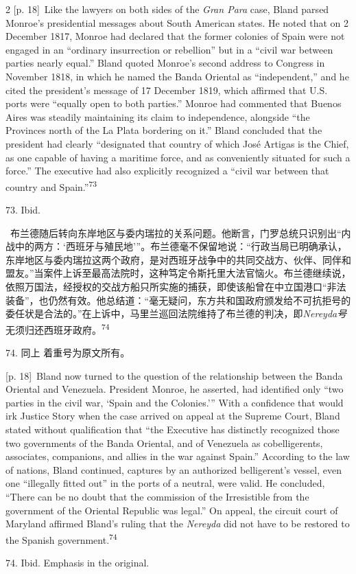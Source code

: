 \documentclass[10pt,a4paper]{article}
\begin{document}
\begin{paracol}{2}
{\scriptsize\color{gray} [p. 18]}\ Like the lawyers on both sides of the \textit{Gran Para} case, Bland parsed Monroe’s presidential messages about South American states. He noted that on 2 December 1817, Monroe had declared that the former colonies of Spain were not engaged in an “ordinary insurrection or rebellion” but in a “civil war between parties nearly equal.” Bland quoted Monroe’s second address to Congress in November 1818, in which he named the Banda Oriental as “independent,” and he cited the president’s message of 17 December 1819, which affirmed that U.S. ports were “equally open to both parties.” Monroe had commented that Buenos Aires was steadily maintaining its claim to independence, alongside “the Provinces north of the La Plata bordering on it.” Bland concluded that the president had clearly “designated that country of which José Artigas is the Chief, as one capable of having a maritime force, and as conveniently situated for such a force.” The executive had also explicitly recognized a “civil war between that country and Spain.”\nobreak\textsuperscript{73}\par{\small 73. Ibid.\par}
\switchcolumn*
{\scriptsize\color{gray} [p. 18]}\ 布兰德随后转向东岸地区与委内瑞拉的关系问题。他断言，门罗总统只识别出“内战中的两方：‘西班牙与殖民地’”。布兰德毫不保留地说：“行政当局已明确承认，东岸地区与委内瑞拉这两个政府，是对西班牙战争中的共同交战方、伙伴、同伴和盟友。”当案件上诉至最高法院时，这种笃定令斯托里大法官恼火。布兰德继续说，依照万国法，经授权的交战方船只所实施的捕获，即使该船曾在中立国港口“非法装备”，也仍然有效。他总结道：“毫无疑问，东方共和国政府颁发给不可抗拒号的委任状是合法的。”在上诉中，马里兰巡回法院维持了布兰德的判决，即\textit{Nereyda号}无须归还西班牙政\mbox{府。\textsuperscript{74}}\par{\small 74. 同上 着重号为原文所有。\par}
\switchcolumn
{\scriptsize\color{gray} [p. 18]}\ Bland now turned to the question of the relationship between the Banda Oriental and Venezuela. President Monroe, he asserted, had identified only “two parties in the civil war, ‘Spain and the Colonies.’” With a confidence that would irk Justice Story when the case arrived on appeal at the Supreme Court, Bland stated without qualification that “the Executive has distinctly recognized those two governments of the Banda Oriental, and of Venezuela as cobelligerents, associates, companions, and allies in the war against Spain.” According to the law of nations, Bland continued, captures by an authorized belligerent’s vessel, even one “illegally fitted out” in the ports of a neutral, were valid. He concluded, “There can be no doubt that the commission of the Irresistible from the government of the Oriental Republic was legal.” On appeal, the circuit court of Maryland affirmed Bland’s ruling that the \textit{Nereyda} did not have to be restored to the Spanish government.\nobreak\textsuperscript{74}\par{\small 74. Ibid. Emphasis in the original.\par}

\end{paracol}
\end{document}
